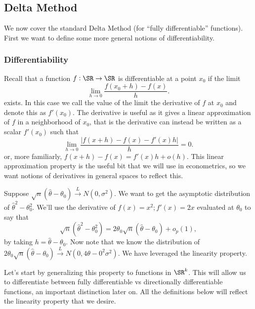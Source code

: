 
\subsection{Delta Method}%
\label{subsec:delta-method}

We now cover the standard Delta Method (for ``fully differentiable'' functions). First we want to define some more general notions of differentiability.

\subsubsection{Differentiability}%
\label{subsubsec:differentiability}

Recall that a function \(f:\SR\to\SR\) is differentiable at a point \(x_0\) if the limit
\[
	\lim_{h\to0} \frac{f(x_0+h)-f(x)}{h} 
.\] 
exists. In this case we call the value of the limit the derivative of \(f\) at \(x_0\) and denote this as \(f'(x_0)\). The derivative is useful as it gives a linear approximation of \(f\) in a neighborhood of \(x_0\), that is the derivative can instead be written as a scalar  \(f'(x_0)\) such that
\[
	 \lim_{h\to 0}\frac{|f(x+h)-f(x)-f'(x)h|}{h} = 0 
.\] 
or, more familiarly, \(f(x+h)-f(x) = f'(x)h + o(h)\). This linear approximation property is the useful bit that we will use in econometrics, so we want notions of derivatives in general spaces to reflect this.
\begin{example*}
	Suppose \(\sqrt{n}\left(\hat\theta-\theta_0\right)\overset{L}{\to}N(0,\sigma^2)\). We want to get the asymptotic distribution of \(\hat\theta^2-\theta_0^2\). We'll use the derivative of \(f(x)=x^2; f'(x)=2x\) evaluated at \(\theta_0\) to say that 
	\[
		\sqrt{n}\left(\hat\theta^2-\theta_0^2\right) = 2\theta_0\sqrt{n}\left(\hat\theta-\theta_0\right) + o_p(1)
	,\]
	by taking \(h = \hat\theta-\theta_0\). Now note that we know the distribution of \(2\theta_0\sqrt{n}\left(\hat\theta-\theta_0\right) \overset{L}{\to} N(0,4\theta-0^2\sigma^2)\). We have leveraged the linearity property.
\end{example*}

Let's start by generalizing this property to functions in \(\SR^k\). This will allow us to differentiate between fully differentiable vs directionally differentiable functions, an important distinction later on. All the definitions below will reflect the linearity property that  we desire.

